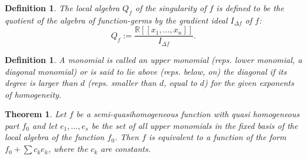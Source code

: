 \documentclass{amsproc}
\begin{document}
\newtheorem{LocalAlgebra}{Definition}
\begin{LocalAlgebra}\label{LocalAlgebra}
The local algebra $Q_f$ of the singularity of $f$ is defined to be the quotient of the algebra of function-germs by the gradient ideal $I_{\Delta f}$ of $f$:
\[Q_f:=\frac{\mathbb R[[x_1,\ldots,x_n]]}{I_{\Delta f}}.\]
\end{LocalAlgebra}
\newtheorem{UpperDiagonalMonomial}{Definition}
\begin{UpperDiagonalMonomial}\label{UpperDiagonalMonomial}
A monomial is called an upper monomial (reps. lower monomial, a diagonal monomial) or is said to lie above (reps. below, on) the diagonal if its degree is larger than $d$ (reps. smaller than $d$, equal to $d$) for the given exponents of homogeneity.
\end{UpperDiagonalMonomial}
\newtheorem{SemiQuasiHomogeneousFunction}{Theorem}
\begin{SemiQuasiHomogeneousFunction}\label{SemiQuasiHomogeneousFunction}
Let $f$ be a semi-quasihomogeneous function with quasi homogeneous part $f_0$ and let $e_1,\ldots, e_s$ be the set of all upper monomials in the fixed basis of the local algebra of the function $f_0$. Then $f$ is equivalent to a function of the form $f_0+\sum c_ke_k$, where the $c_k$ are constants.
\end{SemiQuasiHomogeneousFunction}
\end{document}
